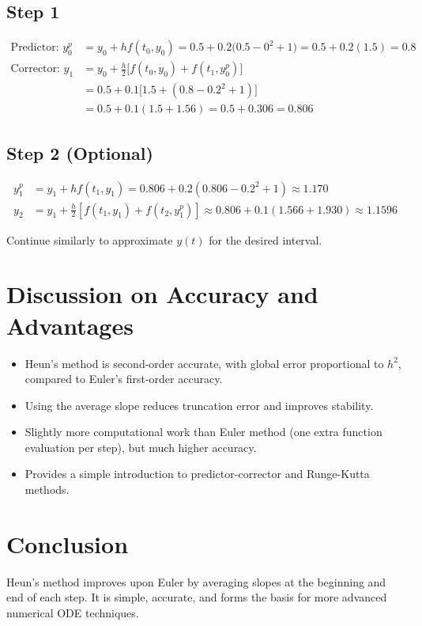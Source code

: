 \documentclass[11pt,a4paper]{article}
\begin{document}
\subsection{Step 1}
\[
\begin{aligned}
\text{Predictor: } y_0^p &= y_0 + h f(t_0, y_0) = 0.5 + 0.2 \big(0.5 - 0^2 + 1\big) = 0.5 + 0.2(1.5) = 0.8 \\
\text{Corrector: } y_1 &= y_0 + \frac{h}{2}\big[f(t_0, y_0) + f(t_1, y_0^p)\big] \\
&= 0.5 + 0.1\big[1.5 + (0.8 - 0.2^2 + 1)\big] \\
&= 0.5 + 0.1(1.5 + 1.56) = 0.5 + 0.306 = 0.806
\end{aligned}
\]

\subsection{Step 2 (Optional)}
\[
\begin{aligned}
y_1^p &= y_1 + h f(t_1, y_1) = 0.806 + 0.2 (0.806 - 0.2^2 + 1) \approx 1.170 \\
y_2 &= y_1 + \frac{h}{2} [f(t_1, y_1) + f(t_2, y_1^p)] \approx 0.806 + 0.1(1.566 + 1.930) \approx 1.1596
\end{aligned}
\]

Continue similarly to approximate \(y(t)\) for the desired interval.

\section{Discussion on Accuracy and Advantages}
\begin{itemize}
    \item Heun's method is second-order accurate, with global error proportional to \(h^2\), compared to Euler's first-order accuracy.  
    \item Using the average slope reduces truncation error and improves stability.  
    \item Slightly more computational work than Euler method (one extra function evaluation per step), but much higher accuracy.  
    \item Provides a simple introduction to predictor-corrector and Runge-Kutta methods.
\end{itemize}

\section{Conclusion}
Heun's method improves upon Euler by averaging slopes at the beginning and end of each step. It is simple, accurate, and forms the basis for more advanced numerical ODE techniques.
\end{document}
